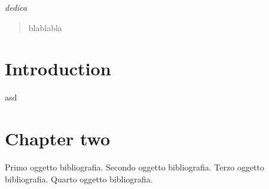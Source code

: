 \documentclass[12pt,a4paper,openright,twoside]{report}
\begin{document}

\clearpage{\pagestyle{empty}\cleardoublepage}
\begin{titlepage}
\thispagestyle{empty}
\topmargin=6.5cm
\raggedleft
\large
\em
dedica
\newpage
\clearpage{\pagestyle{empty}\cleardoublepage}
\end{titlepage}
\begin{abstract}
blablabla
\end{abstract}
\clearpage{\pagestyle{empty}\cleardoublepage}
\tableofcontents
\clearpage{\pagestyle{empty}\cleardoublepage}
\chapter{Introduction}
\lhead[\fancyplain{}{\bfseries\thepage}]{\fancyplain{}{\bfseries\rightmark}}
asd
\chapter{Chapter two}
\lhead[\fancyplain{}{\bfseries\thepage}]{\fancyplain{}{\bfseries\rightmark}}
\begin{thebibliography}{99}
 Primo oggetto bibliografia.
 Secondo oggetto bibliografia.
 Terzo oggetto bibliografia.
 Quarto oggetto bibliografia.
\end{thebibliography}
\end{document}
